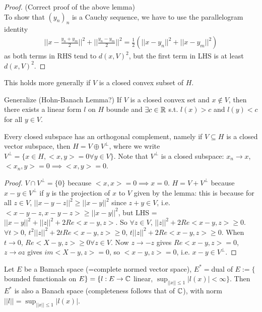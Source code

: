 \documentclass[a4paper]{article}
\begin{document}
\begin{proof} (Correct proof of the above lemma)\\
To show that $(y_n)_n$ is a Cauchy sequence, we have to use the parallelogram identity
\begin{equation*}
\begin{aligned}
||x-\frac{y_n+y_m}{2}||^2 + ||\frac{y_n-y_m}{2}||^2 = \frac{1}{2}(||x-y_n||^2 + ||x-y_m||^2)
\end{aligned}
\end{equation*}
as both terms in RHS tend to $d(x,V)^2$, but the first term in LHS is at least $d(x,V)^2$.
\end{proof}

\begin{rem}
This holds more generally if $V$ is a closed convex subset of $H$.
\end{rem}

Generalize (Hohn-Banach Lemma?) If $V$ is a closed convex set and $x \not\in V$, then there exists a linear form $l$ on $H$ bounde and $\exists c \in \mathbb{R}$ s.t. $l(x) > c$ and $l(y) < c$ for all $y \in V$. 

\begin{coro}
Every closed subspace has an orthogonal complement, namely if $V \subseteq H$ is a closed vector subspace, then $H = V \oplus V^\perp$, where we write $V^\perp = \{x \in H, <x,y> = 0 \forall y \in V\}$. Note that $V^\perp$ is a closed subspace: $x_n \to x$, $<x_n,y> =0 \implies <x,y> = 0$.
\begin{proof}
$V \cap V^\perp = \{0\}$ because $<x,x> = 0 \implies x=0$. $H=V+V^\perp$ because $x-y \in V^\perp$ if $y$ is the projection of $x$ to $V$ given by the lemma: this is because for all $z \in V$, $||x-y-z||^2 \geq ||x-y||^2$ since $z+y \in V$, i.e. $<x-y-z,x-y-z> \geq ||x-y||^2$, but LHS = $||x-y||^2+||z||^2+2Re<x-y,z>$. So $\forall z \in V$, $||z||^2 + 2Re<x-y,z> \geq 0$. $\forall t > 0$, $t^2||z||^2+2tRe<x-y,z> \geq 0$, $t||z||^2 + 2Re<x-y,z> \geq 0$. When $t \to 0$, $Re<X-y,z> \geq 0 \forall z \in V$. Now $z \to -z$ gives $Re<x-y,z>=0$, $z \to oz$ gives $im<X-y,z> = 0$, so $<x-y,z> = 0$, i.e. $x-y \in V^\perp$.
\end{proof}
\end{coro}

Let $E$ be a Bamach space (=complete normed vector space), $E^* = $dual of $E:=\{$ bounded functionals on $E\} = \{l:E \to \mathbb{C}$ linear, $\sup_{||x|| \leq 1} |l(x)| < \infty\}$. Then $E^*$ is also a Banach space (completeness follows that of $\mathbb{C}$), with norm $||l|| = \sup_{||x||\leq 1} |l(x)|$.
\end{document}
